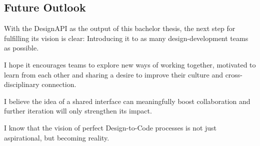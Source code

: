 \newpage
\subsection{Future Outlook}
With the DesignAPI as the output of this bachelor thesis, the next step for fulfilling its vision is
clear: Introducing it to as many design-development teams as possible. 

I hope it encourages teams to explore new ways of working together, motivated to learn from each
other and sharing a desire to improve their culture and cross-disciplinary connection.

I believe the idea of a shared interface can meaningfully boost collaboration and further
iteration will only strengthen its impact.

I know that the vision of perfect Design-to-Code processes is not just aspirational, but becoming
reality.
